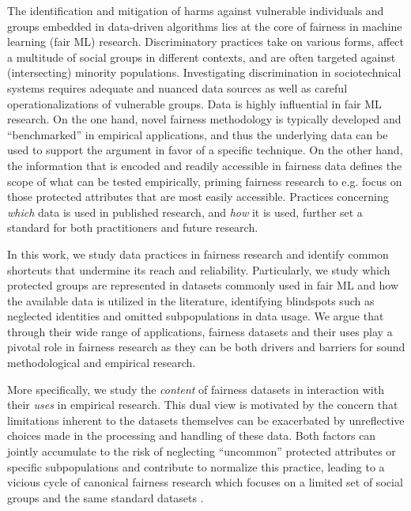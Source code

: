 The identification and mitigation of harms against vulnerable individuals and groups embedded in data-driven algorithms lies at the core of fairness in machine learning (fair ML) research. Discriminatory practices take on various forms, affect a multitude of social groups in different contexts, and are often targeted against (intersecting) minority populations. Investigating discrimination in sociotechnical systems requires adequate and nuanced data sources as well as careful operationalizations of vulnerable groups. Data is highly influential in fair ML research. On the one hand, novel fairness methodology is typically developed and ``benchmarked'' in empirical applications, and thus the underlying data can be used to support the argument in favor of a specific technique. On the other hand, the information that is encoded and readily accessible in fairness data defines the scope of what can be tested empirically, priming fairness research to e.g. focus on those protected attributes that are most easily accessible. Practices concerning \emph{which} data is used in published research, and \emph{how} it is used, further set a standard for both practitioners and future research.

In this work, we study data practices in fairness research and identify common shortcuts that undermine its reach and reliability. Particularly, we study which protected groups are represented in datasets commonly used in fair ML and how the available data is utilized in the literature, identifying blindspots such as neglected identities and omitted subpopulations in data usage. We argue that through their wide range of applications, fairness datasets and their uses play a pivotal role in fairness research as they can be both drivers and barriers for sound methodological and empirical research.

More specifically, we study the \emph{content} of fairness datasets in interaction with their \emph{uses} in empirical research. This dual view is motivated by the concern that limitations inherent to the datasets themselves can be exacerbated by unreflective choices made in the processing and handling of these data. Both factors can jointly accumulate to the risk of neglecting ``uncommon'' protected attributes or specific subpopulations and contribute to normalize this practice, leading to a vicious cycle of canonical fairness research which focuses on a limited set of social groups and the same standard datasets \citep{fabris2022algorithmic}.


